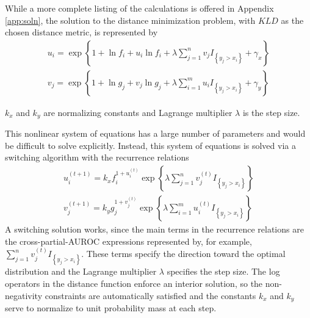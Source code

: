 While a more complete listing of the calculations is offered in Appendix \ref{app:soln}, the solution to the distance minimization problem, with $KLD$ as the chosen distance metric, is represented by
%
\begin{align}
    u_i = \exp{ \left\{ 1 + \ln f_i + u_i \ln f_i
        + \lambda \sum_{j = 1}^{n} v_j I_{\left\{ y_j > x_i \right\}} + \gamma_x \right\} } \\
    v_j = \exp{ \left\{ 1 + \ln g_j + v_j \ln g_j
        + \lambda \sum_{i = 1}^{m} u_i I_{\left\{ y_j > x_i \right\}} + \gamma_y \right\} }
\end{align}

$k_x$ and $k_y$ are normalizing constants and Lagrange multiplier $\lambda$ is the step size.

%
This nonlinear system of equations has a large number of parameters and would be difficult to solve explicitly.
%
Instead, this system of equations is solved via a switching algorithm with the recurrence relations
%
\begin{align}
%
    u_i^{(t+1)} = k_x f_i ^{1 + u_i^{(t)}}
            \exp{ \left\{ \lambda \sum_{j = 1}^{n} v_j^{(t)} I_{\left\{ y_j > x_i \right\}} \right\} } \\
%
    v_j^{(t+1)} = k_y g_j ^{1 + v_j^{(t)}}
            \exp{ \left\{ \lambda \sum_{i = 1}^{m} u_i^{(t)} I_{\left\{ y_j > x_i \right\}}  \right\} }
%
\end{align}
%
\noindent A switching solution works, since the main terms in the recurrence relations are the cross-partial-AUROC expressions represented by, for example, $\sum_{j = 1}^{n} v_j^{(t)} I_{\left\{ y_j > x_i \right\}}$.
%
These terms specify the direction toward the optimal distribution and the Lagrange multiplier $\lambda$ specifies the step size.
The log operators in the distance function enforce an interior solution, so the non-negativity constraints are automatically satisfied and the constants $k_x$ and $k_y$ serve to normalize to unit probability mass at each step.

%



